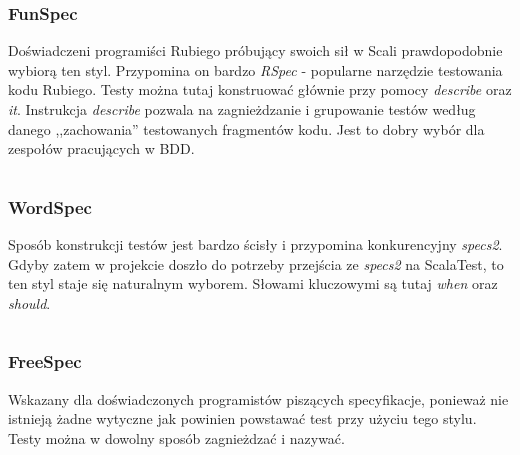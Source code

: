 \documentclass[brudnopis]{xmgr}
\begin{document}
\inputminted[fontsize=\small]{scala}{code/FlatSpec.scala}

\subsubsection{FunSpec}

Doświadczeni programiści Rubiego próbujący swoich sił w Scali prawdopodobnie wybiorą ten styl. Przypomina on bardzo \emph{RSpec} - popularne narzędzie testowania kodu Rubiego. Testy można tutaj konstruować głównie przy pomocy \emph{describe} oraz \emph{it}. Instrukcja \emph{describe} pozwala na zagnieżdzanie i grupowanie testów według danego ,,zachowania'' testowanych fragmentów kodu. Jest to dobry wybór dla zespołów pracujących w BDD.

\inputminted[fontsize=\small]{scala}{code/FunSpec.scala}

\subsubsection{WordSpec}

Sposób konstrukcji testów jest bardzo ścisły i przypomina konkurencyjny \emph{specs2}. Gdyby zatem w projekcie doszło do potrzeby przejścia ze \emph{specs2} na ScalaTest, to ten styl staje się naturalnym wyborem. Słowami kluczowymi są tutaj \emph{when} oraz \emph{should}.

\inputminted[fontsize=\small]{scala}{code/WordSpec.scala}

\subsubsection{FreeSpec}

Wskazany dla doświadczonych programistów piszących specyfikacje, ponieważ nie istnieją żadne wytyczne jak powinien powstawać test przy użyciu tego stylu. Testy można w dowolny sposób zagnieżdzać i nazywać.

\inputminted[fontsize=\small]{scala}{code/FreeSpec.scala}
\end{document}
